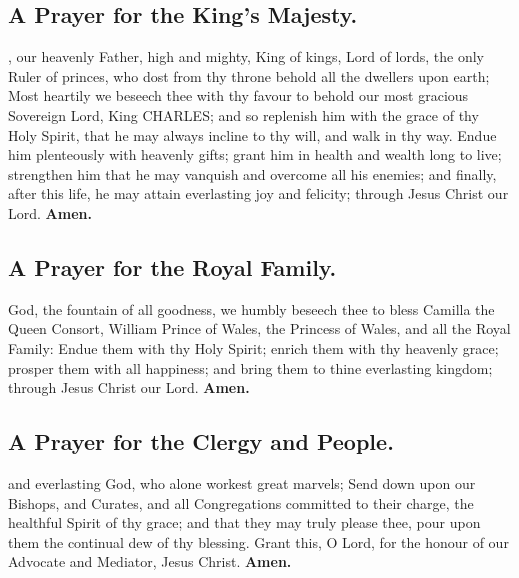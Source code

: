 \subsection{A Prayer for the King's Majesty.}

, our heavenly Father, high and mighty, King of kings, Lord of lords, the only Ruler of princes, who dost from thy throne behold all the dwellers upon earth; Most heartily we beseech thee with thy favour to behold our most gracious Sovereign Lord, King CHARLES; and so replenish him with the grace of thy Holy Spirit, that he may always incline to thy will, and walk in thy way. Endue him plenteously with heavenly gifts; grant him in health and wealth long to live; strengthen him that he may vanquish and overcome all his enemies; and finally, after this life, he may attain everlasting joy and felicity; through Jesus Christ our Lord.
\textbf{Amen.}

\subsection{A Prayer for the Royal Family.}

 God, the fountain of all goodness, we humbly beseech thee to bless Camilla the Queen Consort, William Prince of Wales, the Princess of Wales, and all the Royal Family: Endue them with thy Holy Spirit; enrich them with thy heavenly grace; prosper them with all happiness; and bring them to thine everlasting kingdom; through Jesus Christ our Lord.
\textbf{Amen.}

\subsection{A Prayer for the Clergy and People.}

 and everlasting God, who alone workest great marvels; Send down upon our Bishops, and Curates, and all Congregations committed to their charge, the healthful Spirit of thy grace; and that they may truly please thee, pour upon them the continual dew of thy blessing. Grant this, O Lord, for the honour of our Advocate and Mediator, Jesus Christ.
\textbf{Amen.}
